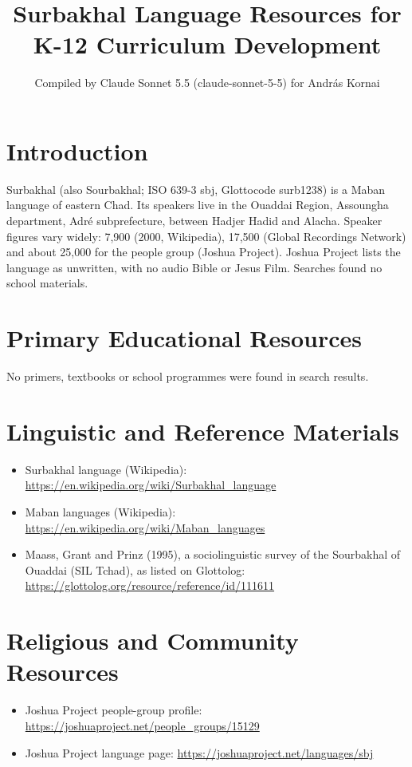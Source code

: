\documentclass[12pt]{article}
\title{Surbakhal Language Resources for K-12 Curriculum Development}
\author{Compiled by Claude Sonnet 5.5 (claude-sonnet-5-5) for Andr\'as Kornai}
\date{}
\begin{document}
\maketitle

\section{Introduction}
Surbakhal (also Sourbakhal; ISO 639-3 sbj, Glottocode surb1238) is a Maban language of eastern Chad. Its speakers live in the Ouaddai Region, Assoungha department, Adr\'e subprefecture, between Hadjer Hadid and Alacha. Speaker figures vary widely: 7,900 (2000, Wikipedia), 17,500 (Global Recordings Network) and about 25,000 for the people group (Joshua Project). Joshua Project lists the language as unwritten, with no audio Bible or Jesus Film. Searches found no school materials.

\section{Primary Educational Resources}
No primers, textbooks or school programmes were found in search results.

\section{Linguistic and Reference Materials}
\begin{itemize}
\item Surbakhal language (Wikipedia): \url{https://en.wikipedia.org/wiki/Surbakhal_language}
\item Maban languages (Wikipedia): \url{https://en.wikipedia.org/wiki/Maban_languages}
\item Maass, Grant and Prinz (1995), a sociolinguistic survey of the Sourbakhal of Ouaddai (SIL Tchad), as listed on Glottolog: \url{https://glottolog.org/resource/reference/id/111611}
\end{itemize}

\section{Religious and Community Resources}
\begin{itemize}
\item Joshua Project people-group profile: \url{https://joshuaproject.net/people_groups/15129}
\item Joshua Project language page: \url{https://joshuaproject.net/languages/sbj}
\end{itemize}
\end{document}
